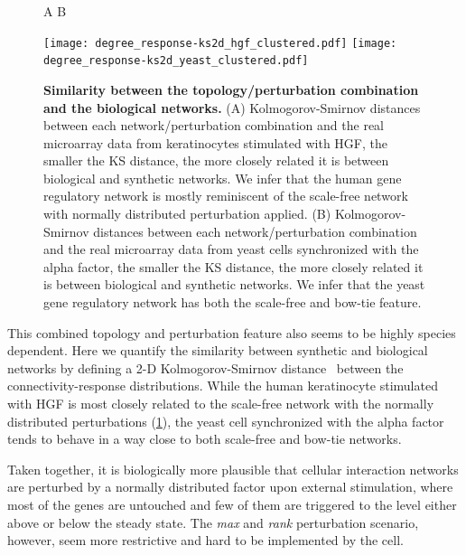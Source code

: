 \begin{figure}[!ht]
\hskip 0.5in A \hskip 2.5in B
\begin{center}
\texttt{[image: degree\_response-ks2d\_hgf\_clustered.pdf]}
\texttt{[image: degree\_response-ks2d\_yeast\_clustered.pdf]}
\end{center}
\caption[Comparison of the synthetic and biological networks]{
{\bf Similarity between the topology/perturbation combination and the 
biological networks.} 
(A) Kolmogorov-Smirnov distances between each
network/perturbation combination and the real microarray
data from keratinocytes stimulated with HGF, the smaller
the KS distance, the more closely related it is between
biological and synthetic networks. We infer that the human
gene regulatory network is mostly reminiscent of the
scale-free network with normally distributed perturbation
applied.
(B) Kolmogorov-Smirnov distances between each
network/perturbation combination and the real microarray
data from yeast cells synchronized with the alpha factor,
the smaller
the KS distance, the more closely related it is between
biological and synthetic networks. We infer that the yeast
gene regulatory network has both the scale-free and bow-tie
feature.
}
\label{fig:degree_response_ks2d}
\end{figure}

This combined topology and perturbation feature also seems to be highly
species dependent. Here we quantify the similarity between synthetic
and biological networks by defining a 2-D Kolmogorov-Smirnov distance~%
\citep{Press2007}
between the connectivity-response distributions.
While the human keratinocyte stimulated with HGF is
most closely related to the scale-free network with the normally distributed
perturbations (\ref{fig:degree_response_ks2d}), the yeast cell synchronized
with the alpha factor tends to behave in a way close to both scale-free and
bow-tie networks.

Taken together, it is 
biologically more plausible that cellular interaction 
networks are perturbed by a normally
distributed factor upon external stimulation, where most of the genes are
untouched and few of them are triggered to the level either above or
below the steady state. The \emph{max} and \emph{rank} perturbation scenario, however, 
seem more restrictive and hard to be implemented by the cell.

